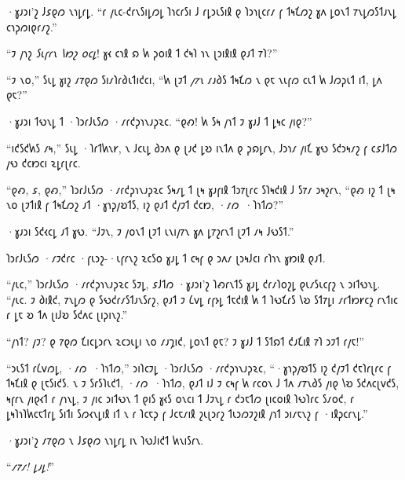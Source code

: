 ·𐑣𐑨𐑮𐑦'𐑟 𐑓𐑭𐑞𐑼 𐑯𐑪𐑛𐑩𐑛. “𐑩 𐑢𐑧𐑤-𐑒𐑩𐑯𐑕𐑦𐑛𐑼𐑛 𐑐𐑪𐑤𐑩𐑕𐑦 𐑓 𐑩𐑛𐑮𐑧𐑕𐑦𐑙 𐑞 𐑐𐑮𐑪𐑚𐑤𐑩𐑥 𐑝 𐑑𐑰𐑗𐑼𐑟 𐑣𐑵 𐑛𐑴𐑯𐑑 𐑳𐑯𐑛𐑼𐑕𐑑𐑨𐑯𐑛 𐑤𐑪𐑜𐑼𐑦𐑞𐑩𐑥𐑟.”

“𐑲 𐑢𐑪𐑟 \emph{𐑕𐑧𐑝𐑩𐑯 𐑘𐑽𐑟 𐑴𐑤𐑛}! 𐑣𐑬 𐑤𐑪𐑙 𐑸 𐑿 𐑜𐑴𐑦𐑙 𐑑 𐑒𐑰𐑐 𐑪𐑯 𐑚𐑮𐑦𐑙𐑦𐑙 𐑞𐑨𐑑 𐑳𐑐?”

“𐑲 𐑯𐑴,” 𐑕𐑧𐑛 𐑣𐑦𐑟 𐑥𐑳𐑞𐑼 𐑕𐑦𐑥𐑐𐑩𐑔𐑧𐑑𐑦𐑒𐑤𐑦, “𐑿 𐑚𐑲𐑑 \emph{𐑢𐑳𐑯} 𐑥𐑨𐑔𐑕 𐑑𐑰𐑗𐑼 𐑯 𐑞𐑱 𐑯𐑧𐑝𐑼 𐑤𐑧𐑑 𐑿 𐑓𐑼𐑜𐑧𐑑 𐑦𐑑, 𐑛𐑵 𐑞𐑱?”

·𐑣𐑨𐑮𐑦 𐑑𐑻𐑯𐑛 𐑑 ·𐑐𐑮𐑩𐑓𐑧𐑕𐑼 ·𐑥𐑩𐑒𐑜𐑪𐑯𐑨𐑜𐑷𐑤. “𐑞𐑺! 𐑿 𐑕𐑰 𐑢𐑪𐑑 𐑲 𐑣𐑨𐑓 𐑑 𐑛𐑰𐑤 𐑢𐑦𐑞?”

“𐑦𐑒𐑕𐑒𐑿𐑕 𐑥𐑰,” 𐑕𐑧𐑛 ·𐑐𐑩𐑑𐑿𐑯𐑾, 𐑯 𐑓𐑤𐑧𐑛 𐑔𐑮𐑵 𐑞 𐑚𐑨𐑒 𐑛𐑹 𐑦𐑯𐑑𐑵 𐑞 𐑜𐑸𐑛𐑩𐑯, 𐑓𐑮𐑪𐑥 𐑢𐑦𐑗 𐑣𐑻 𐑕𐑒𐑮𐑰𐑥𐑟 𐑝 𐑤𐑭𐑓𐑑𐑼 𐑢𐑻 𐑒𐑤𐑽𐑤𐑦 𐑷𐑛𐑩𐑚𐑩𐑤.

“𐑞𐑺, 𐑭, 𐑞𐑺,” 𐑐𐑮𐑩𐑓𐑧𐑕𐑼 ·𐑥𐑩𐑒𐑜𐑪𐑯𐑨𐑜𐑷𐑤 𐑕𐑰𐑥𐑛 𐑑 𐑚𐑰 𐑣𐑨𐑝𐑦𐑙 𐑑𐑮𐑳𐑚𐑩𐑤 𐑕𐑐𐑰𐑒𐑦𐑙 𐑓 𐑕𐑳𐑥 𐑮𐑰𐑟𐑩𐑯, “𐑞𐑺 𐑦𐑟 𐑑 𐑚𐑰 𐑯𐑴 𐑚𐑲𐑑𐑦𐑙 𐑝 𐑑𐑰𐑗𐑼𐑟 𐑨𐑑 ·𐑣𐑪𐑜𐑢𐑹𐑑𐑕, 𐑦𐑟 𐑞𐑨𐑑 𐑒𐑢𐑲𐑑 𐑒𐑤𐑽, ·𐑥𐑼~·𐑐𐑪𐑑𐑼?”

·𐑣𐑨𐑮𐑦 𐑕𐑒𐑬𐑤𐑛 𐑨𐑑 𐑣𐑻. “𐑓𐑲𐑯, 𐑲 𐑢𐑴𐑯𐑑 𐑚𐑲𐑑 𐑧𐑯𐑦𐑢𐑳𐑯 𐑣𐑵 𐑛𐑳𐑟𐑩𐑯𐑑 𐑚𐑲𐑑 𐑥𐑰 𐑓𐑻𐑕𐑑.”

𐑐𐑮𐑩𐑓𐑧𐑕𐑼 ·𐑥𐑲𐑒𐑩𐑤 ·𐑝𐑧𐑮𐑟-·𐑧𐑝𐑩𐑯𐑟 𐑷𐑤𐑕𐑴 𐑣𐑨𐑛 𐑑 𐑤𐑰𐑝 𐑞 𐑮𐑵𐑥 𐑚𐑮𐑰𐑓𐑤𐑦 𐑩𐑐𐑪𐑯 𐑣𐑽𐑦𐑙 𐑞𐑨𐑑.

“𐑢𐑧𐑤,” 𐑐𐑮𐑩𐑓𐑧𐑕𐑼 ·𐑥𐑩𐑒𐑜𐑪𐑯𐑨𐑜𐑷𐑤 𐑕𐑲𐑛, 𐑭𐑓𐑑𐑼 ·𐑣𐑨𐑮𐑦'𐑟 𐑐𐑺𐑩𐑯𐑑𐑕 𐑣𐑨𐑛 𐑒𐑩𐑥𐑐𐑴𐑟𐑛 𐑞𐑧𐑥𐑕𐑧𐑤𐑝𐑟 𐑯 𐑮𐑦𐑑𐑻𐑯𐑛. “𐑢𐑧𐑤. 𐑲 𐑔𐑦𐑙𐑒, 𐑳𐑯𐑛𐑼 𐑞 𐑕𐑻𐑒𐑩𐑥𐑕𐑑𐑨𐑯𐑕𐑩𐑟, 𐑞𐑨𐑑 𐑲 𐑖𐑫𐑛 𐑩𐑝𐑶𐑛 𐑑𐑱𐑒𐑦𐑙 𐑿 𐑑 𐑐𐑻𐑗𐑩𐑕 𐑘𐑹 𐑕𐑑𐑳𐑛𐑦 𐑥𐑩𐑑𐑽𐑾𐑤𐑟 𐑩𐑯𐑑𐑦𐑤 𐑩 𐑛𐑱 𐑹 𐑑𐑵 𐑚𐑦𐑓𐑹 𐑕𐑒𐑵𐑤 𐑚𐑦𐑜𐑦𐑯𐑟.”

“𐑢𐑪𐑑? 𐑢𐑲? 𐑞 𐑳𐑞𐑼 𐑗𐑦𐑤𐑛𐑮𐑩𐑯 𐑷𐑤𐑮𐑧𐑛𐑦 𐑯𐑴 𐑥𐑨𐑡𐑦𐑒, 𐑛𐑴𐑯𐑑 𐑞𐑱? 𐑲 𐑣𐑨𐑓 𐑑 𐑕𐑑𐑸𐑑 𐑒𐑨𐑗𐑦𐑙 𐑳𐑐 𐑮𐑲𐑑 𐑩𐑢𐑱!”

“𐑮𐑧𐑕𐑑 𐑩𐑖𐑫𐑼𐑛, ·𐑥𐑼~·𐑐𐑪𐑑𐑼,” 𐑮𐑦𐑐𐑤𐑲𐑛 ·𐑐𐑮𐑩𐑓𐑧𐑕𐑼 ·𐑥𐑩𐑒𐑜𐑪𐑯𐑨𐑜𐑷𐑤, “·𐑣𐑪𐑜𐑢𐑹𐑑𐑕 𐑦𐑟 𐑒𐑢𐑲𐑑 𐑒𐑱𐑐𐑩𐑚𐑩𐑤 𐑝 𐑑𐑰𐑗𐑦𐑙 𐑞 𐑚𐑱𐑕𐑦𐑒𐑕. 𐑯 𐑲 𐑕𐑩𐑕𐑐𐑧𐑒𐑑, ·𐑥𐑼~·𐑐𐑪𐑑𐑼, 𐑞𐑨𐑑 𐑦𐑓 𐑲 𐑤𐑰𐑝 𐑿 𐑩𐑤𐑴𐑯 𐑓 𐑑𐑵 𐑥𐑳𐑯𐑔𐑕 𐑢𐑦𐑞 𐑘𐑹 𐑕𐑒𐑵𐑤𐑚𐑫𐑒𐑕, 𐑰𐑝𐑩𐑯 𐑢𐑦𐑞𐑬𐑑 𐑩 𐑢𐑪𐑯𐑛, 𐑲 𐑢𐑦𐑤 𐑮𐑦𐑑𐑻𐑯 𐑑 𐑞𐑦𐑕 𐑣𐑬𐑕 𐑴𐑯𐑤𐑦 𐑑 𐑓𐑲𐑯𐑛 𐑩 𐑒𐑮𐑱𐑑𐑼 𐑚𐑦𐑤𐑴𐑦𐑙 𐑐𐑻𐑐𐑩𐑤 𐑕𐑥𐑴𐑒, 𐑩 𐑛𐑰𐑐𐑪𐑐𐑿𐑤𐑱𐑑𐑩𐑛 𐑕𐑦𐑑𐑦 𐑕𐑼𐑬𐑯𐑛𐑦𐑙 𐑦𐑑 𐑯 𐑩 𐑐𐑤𐑱𐑜 𐑝 𐑓𐑤𐑱𐑥𐑦𐑙 𐑟𐑧𐑚𐑮𐑩𐑟 𐑑𐑧𐑮𐑼𐑲𐑟𐑦𐑙 𐑢𐑪𐑑 𐑮𐑦𐑥𐑱𐑯𐑟 𐑝 ·𐑦𐑙𐑜𐑤𐑩𐑯𐑛.”

·𐑣𐑨𐑮𐑦'𐑟 𐑥𐑳𐑞𐑼 𐑯 𐑓𐑭𐑞𐑼 𐑯𐑪𐑛𐑩𐑛 𐑦𐑯 𐑐𐑻𐑓𐑦𐑒𐑑 𐑿𐑯𐑦𐑕𐑩𐑯.

“\emph{𐑥𐑳𐑥! 𐑛𐑨𐑛!}”

